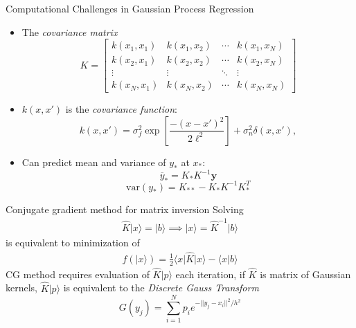 \documentclass[xcolor=pdftex,dvipsnames,table]{beamer}
\newcommand{\eq}[1]{\begin{align*} #1 \end{align*}}
\let\vec\mathbf
\newcommand{\abs}[1]{\lvert #1 \rvert}
\newcommand{\bra}[1]{\langle #1 \rvert}
\newcommand{\ket}[1]{\lvert #1 \rangle}
\begin{document}
\begin{frame}{Computational Challenges in Gaussian Process Regression}
\begin{itemize}
\item The \emph{covariance matrix}
\begin{equation}
  K = \begin{bmatrix}
  k(x_1,x_1) & k(x_1, x_2) & \cdots & k(x_1,x_N) \\
  k(x_2,x_1) & k(x_2, x_2) & \cdots & k(x_2,x_N) \\
  \vdots & \vdots & \ddots & \vdots \\
  k(x_N,x_1) & k(x_N, x_2) & \cdots & k(x_N,x_N)
  \end{bmatrix}
\end{equation}
\item $k(x,x')$ is the \emph{covariance function}:
\begin{equation}
  k(x,x') = \sigma_f^2 \exp\left[\frac{-(x-x')^2}{2\ell^2}\right] + \sigma_n^2\delta(x,x'),
\end{equation}
\item Can predict mean and variance of $y_\ast$ at $x_\ast$:
\begin{equation}
\overline{y}_\ast = K_\ast K^{-1}\vec{y}
\end{equation}
\begin{equation}
\text{var}(y_\ast) = K_{\ast\ast}-K_\ast K^{-1}K_\ast^T
\end{equation}
\end{itemize}
\end{frame}
\begin{frame}{Conjugate gradient method for matrix inversion}
Solving 
  \eq{\hat{K}\ket{x} = \ket{b} \implies \ket{x} = \hat{K}^{-1}\ket{b}}
is equivalent to minimization of
  \eq{f(\ket{x})=\frac{1}{2}\bra{x}\hat{K}\ket{x}-\bra{x}b\rangle}
CG method requires evaluation of $\hat{K}\ket{p}$ each iteration, if $\hat{K}$ is matrix of Gaussian kernels, $\hat{K}\ket{p}$ is equivalent to the \emph{Discrete Gauss Transform}
\begin{equation}
  G(y_j) = \sum_{i=1}^{N} p_i e^{-\abs{\abs{y_j-x_i}}^2/h^2}
\end{equation}
\end{frame}
\end{document}
